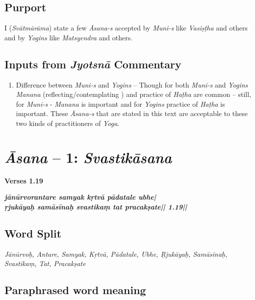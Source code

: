 \subsection*{Purport}

I (\textit{Svātmārāma}) state a few \textit{Āsana-s} accepted by \textit{Muni-s} like \textit{Vasiṣṭha} and others and by \textit{Yogins} like \textit{Matsyendra} and others.  

\subsection*{Inputs from \textit{Jyotsnā} Commentary}

\begin{enumerate}
\item Difference between \textit{Muni-s} and \textit{Yogins} – Though for both \textit{Muni-s} and \textit{Yogins} \textit{Manana} (reflecting/contemplating ) and practice of \textit{Haṭha} are common – still, for  \textit{Muni-s} - \textit{Manana} is important and for \textit{Yogins} practice of \textit{Haṭha} is important. These \textit{Āsana-s} that are stated in this text are acceptable to these two kinds of practitioners of \textit{Yoga}.
\end{enumerate}

\section*{\textit{Āsana} -- 1: \textit{Svastikāsana}}

\noindent \textbf{Verses 1.19}

\begin{shloka}
\textit{\textbf{jānūrvorantare samyak kṛtvā pādatale ubhe|}\\
\textbf{ṛjukāyaḥ samāsīnaḥ svastikaṃ tat pracakṣate|| 1.19||}}
\end{shloka}

\subsection*{Word Split}

\textit{Jānūrvoḥ, Antare, Samyak, Kṛtvā, Pādatale, Ubhe, Ṛjukāyaḥ, Samāsīnaḥ, Svastikaṃ, Tat, Pracakṣate}

\vspace{-5pt}

\subsection*{Paraphrased word meaning}
\vspace{-10pt}


